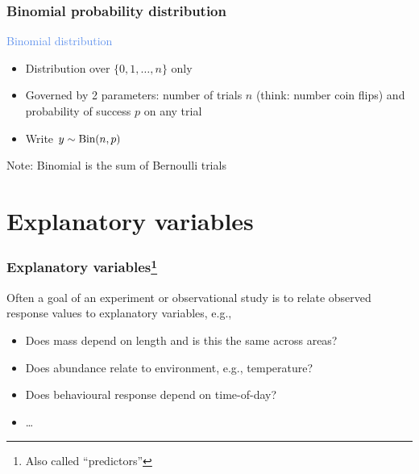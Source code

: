 \documentclass[dvipsnames]{beamer}
\begin{document}
\begin{frame}
 \frametitle{Binomial probability distribution}
 \begin{center}
 \textcolor{CornflowerBlue}{Binomial distribution}
 \end{center}

\begin{itemize}
  \item<only@2> Distribution over $\{0, 1, \dots,n\}$ only
  \item Governed by 2 parameters: number of trials $n$ (think: number coin flips) and probability of success $p$ on any trial
  \item Write $y \sim \textnormal{Bin}(n,p)$
 \end{itemize}
 Note: Binomial is the sum of Bernoulli trials
\end{frame}

\section{Explanatory variables}
\begin{frame}
 \frametitle{Explanatory variables\footnote{Also called ``predictors''}}
 Often a goal of an experiment or observational study is to relate observed response values to explanatory variables, e.g.,
 \begin{itemize}
  \item<2-> Does mass depend on length and is this the same across areas?
  \item<3-> Does abundance relate to environment, e.g., temperature?
  \item<4-> Does behavioural response depend on time-of-day?
  \item<5-> \dots
 \end{itemize}
\end{frame}
\end{document}
